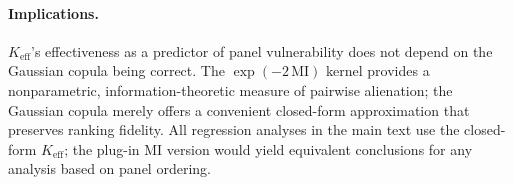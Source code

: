 \paragraph{Implications.} $K_{\mathrm{eff}}$'s effectiveness as a predictor of panel vulnerability does not depend on the Gaussian copula being correct. The $\exp(-2\,\mathrm{MI})$ kernel provides a nonparametric, information-theoretic measure of pairwise alienation; the Gaussian copula merely offers a convenient closed-form approximation that preserves ranking fidelity. All regression analyses in the main text use the closed-form $K_{\mathrm{eff}}$; the plug-in MI version would yield equivalent conclusions for any analysis based on panel ordering.
